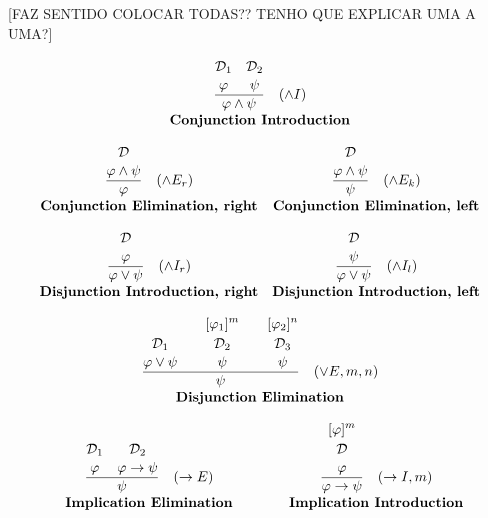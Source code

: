 [FAZ SENTIDO COLOCAR TODAS?? TENHO QUE EXPLICAR UMA A UMA?]

\[
\begin{array}{c c}

\multicolumn{2}{c}{
\frac{\overset{\displaystyle\mathcal{D}_1\strut}{\displaystyle \varphi \strut}\quad \overset{\displaystyle\mathcal{D}_2\strut} {\displaystyle \psi \strut}}{\displaystyle \varphi \land \psi \strut} \quad (\land I)
} \\[5pt]
\multicolumn{2}{c}{\textbf{Conjunction Introduction}} \\[10pt]

\frac{\displaystyle \overset{\displaystyle\mathcal{D} \strut} {\varphi \land \psi \strut}}{\displaystyle \varphi \strut} \quad (\land E_r) 
& \frac{\displaystyle \overset{\displaystyle\mathcal{D} \strut} {\varphi \land \psi \strut}}{\displaystyle \psi \strut} \quad (\land E_k) \\[5pt]
\textbf{Conjunction Elimination, right} & \textbf{Conjunction Elimination, left} \\[10pt]

\frac{\displaystyle \overset{\displaystyle\mathcal{D} \strut} {\varphi 
\strut}}{\displaystyle \varphi \vee \psi \strut} \quad (\land I_r) 
& \frac{\displaystyle \overset{\displaystyle\mathcal{D} \strut} {\psi \strut}}{\displaystyle \varphi \vee \psi \strut} \quad (\land I_l) \\[5pt]
\textbf{Disjunction Introduction, right} & \textbf{Disjunction Introduction, left} \\[10pt]

\multicolumn{2}{c}{
\frac{\overset{\displaystyle\mathcal{D}_1 \strut} {\displaystyle\varphi \vee \psi \strut} \quad \quad \overset{\displaystyle[\varphi_1]^m\strut}{\overset{\displaystyle\mathcal{D}_2 \strut} {\displaystyle\psi 
\strut}} \quad \quad \overset{\displaystyle[\varphi_2]^n\strut}{\overset{\displaystyle\mathcal{D}_3 \strut} {\displaystyle\psi 
\strut}}}{\displaystyle\psi\strut} \quad (\vee E, m, n)
} \\[5pt]
\multicolumn{2}{c}{\textbf{Disjunction Elimination}} \\[10pt]

\frac{\overset{\displaystyle\mathcal{D}_1\strut}{\displaystyle \varphi \strut}\quad \overset{\displaystyle\mathcal{D}_2\strut} {\displaystyle \varphi \to \psi \strut}}{\displaystyle\psi\strut} \quad (\to E) 
& \frac{\overset{\displaystyle[\varphi]^m\strut}{\overset{\displaystyle\mathcal{D} \strut} {\displaystyle\varphi 
\strut}}}{\displaystyle \varphi \to \psi \strut} \quad (\to I, m) \\[5pt]
\textbf{Implication Elimination} & \textbf{Implication Introduction}\\[10pt]


\end{array}\]
